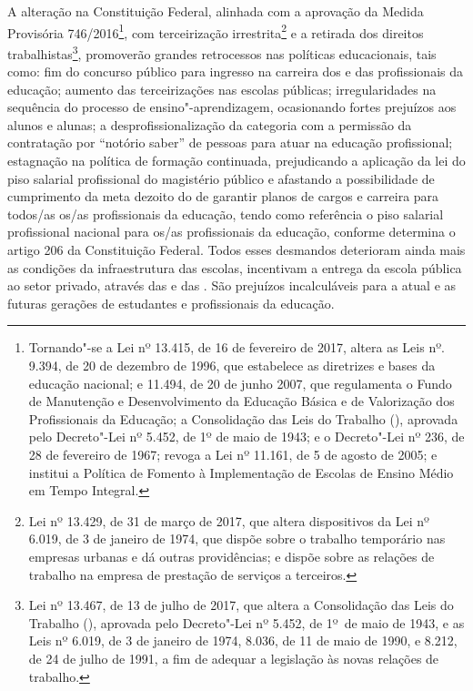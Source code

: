 A alteração na Constituição Federal, alinhada com a aprovação da Medida
Provisória 746/2016\footnote{Tornando"-se a Lei nº 13.415, de 16
  de fevereiro de 2017, altera as Leis nº. 9.394, de 20 de dezembro de
  1996, que estabelece as diretrizes e bases da educação nacional; e
  11.494, de 20 de junho 2007, que regulamenta o Fundo de Manutenção e
  Desenvolvimento da Educação Básica e de Valorização dos Profissionais
  da Educação; a Consolidação das Leis do Trabalho (), aprovada pelo
  Decreto"-Lei nº 5.452, de 1º de maio de 1943; e o Decreto"-Lei nº 236,
  de 28 de fevereiro de 1967; revoga a Lei nº 11.161, de 5 de agosto de
  2005; e institui a Política de Fomento à Implementação de Escolas de
  Ensino Médio em Tempo Integral.}, com terceirização
irrestrita\footnote{Lei nº 13.429, de 31 de março de 2017, que
  altera dispositivos da Lei nº 6.019, de 3 de
  janeiro de 1974, que dispõe sobre o trabalho temporário nas empresas
  urbanas e dá outras providências; e dispõe sobre as relações de
  trabalho na empresa de prestação de serviços a terceiros.} e a
retirada dos direitos trabalhistas\footnote{Lei nº 13.467, de 13
  de julho de 2017, que altera a Consolidação das Leis do Trabalho (),
  aprovada pelo Decreto"-Lei nº 5.452, de
  1º~de maio de 1943, e as Leis
  nº 6.019, de 3 de janeiro de 1974, 8.036, de
  11 de maio de 1990, e 8.212, de 24 de julho de 1991, a fim de adequar
  a legislação às novas relações de trabalho.}, promoverão grandes
retrocessos nas políticas educacionais, tais como: fim do concurso
público para ingresso na carreira dos e das profissionais da educação;
aumento das terceirizações nas escolas públicas; irregularidades na
sequência do processo de ensino"-aprendizagem, ocasionando fortes
prejuízos aos alunos e alunas; a desprofissionalização da categoria com
a permissão da contratação por ``notório saber'' de pessoas para atuar
na educação profissional; estagnação na política de formação continuada,
prejudicando a aplicação da lei do piso salarial profissional do
magistério público e afastando a possibilidade de cumprimento da meta
dezoito do  de garantir planos de cargos e carreira para todos/as
os/as profissionais da educação, tendo como referência o piso salarial
profissional nacional para os/as profissionais da educação, conforme
determina o artigo 206 da Constituição Federal. Todos esses desmandos
deterioram ainda mais as condições da infraestrutura das escolas,
incentivam a entrega da escola pública ao setor privado, através das 
e das . São prejuízos incalculáveis para a atual e as futuras
gerações de estudantes e profissionais da educação.

